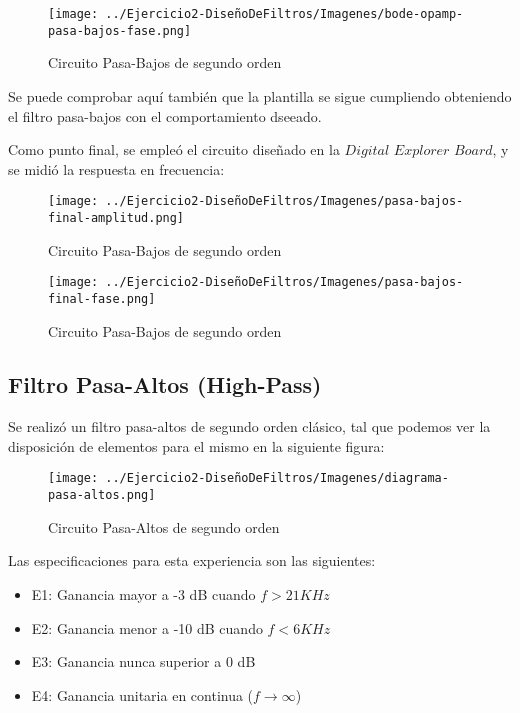 \begin{figure}[H]
    \centering
    \texttt{[image: ../Ejercicio2-DiseñoDeFiltros/Imagenes/bode-opamp-pasa-bajos-fase.png]}
    \caption{Circuito Pasa-Bajos de segundo orden}
\end{figure}

Se puede comprobar aquí también que la plantilla se sigue cumpliendo obteniendo el filtro pasa-bajos con el comportamiento dseeado.

Como punto final, se empleó el circuito diseñado en la $Digital$ $Explorer$ $Board$, y se midió la respuesta en frecuencia:

\begin{figure}[H]
    \centering
    \texttt{[image: ../Ejercicio2-DiseñoDeFiltros/Imagenes/pasa-bajos-final-amplitud.png]}
    \caption{Circuito Pasa-Bajos de segundo orden}
\end{figure}

\begin{figure}[H]
    \centering
    \texttt{[image: ../Ejercicio2-DiseñoDeFiltros/Imagenes/pasa-bajos-final-fase.png]}
    \caption{Circuito Pasa-Bajos de segundo orden}
\end{figure}



\subsection{Filtro Pasa-Altos (High-Pass)}

Se realizó un filtro pasa-altos de segundo orden clásico, tal que podemos
ver la disposición de elementos para el mismo en la siguiente figura:

\begin{figure}[H]
    \centering
    \texttt{[image: ../Ejercicio2-DiseñoDeFiltros/Imagenes/diagrama-pasa-altos.png]}
    \caption{Circuito Pasa-Altos de segundo orden}
\end{figure}

Las especificaciones para esta experiencia son las siguientes:

\begin{itemize}
	\item E1: Ganancia mayor a -3 dB cuando $f > 21 KHz$ 
	\item E2: Ganancia menor a -10 dB cuando $f < 6 KHz $
	\item E3: Ganancia nunca superior a 0 dB
	\item E4: Ganancia unitaria en continua ($f \to \infty$)
\end{itemize}

